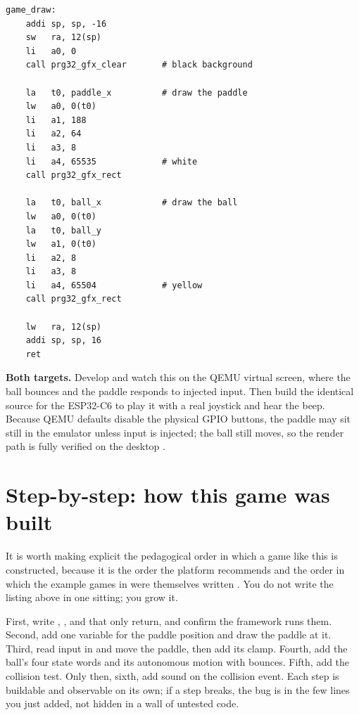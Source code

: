 \begin{lstlisting}[style=asm,caption={The \code{draw} of the complete game. Compare it line for line with \code{pong\_graphics\_draw} in the repository.}]
game_draw:
    addi sp, sp, -16
    sw   ra, 12(sp)
    li   a0, 0
    call prg32_gfx_clear       # black background

    la   t0, paddle_x          # draw the paddle
    lw   a0, 0(t0)
    li   a1, 188
    li   a2, 64
    li   a3, 8
    li   a4, 65535             # white
    call prg32_gfx_rect

    la   t0, ball_x            # draw the ball
    lw   a0, 0(t0)
    la   t0, ball_y
    lw   a1, 0(t0)
    li   a2, 8
    li   a3, 8
    li   a4, 65504             # yellow
    call prg32_gfx_rect

    lw   ra, 12(sp)
    addi sp, sp, 16
    ret
\end{lstlisting}

\begin{prgtargets}
\textbf{Both targets.} Develop and watch this on the QEMU virtual screen, where
the ball bounces and the paddle responds to injected input. Then build the
identical source for the ESP32\nobreakdash-C6 to play it with a real joystick and hear the
beep. Because QEMU defaults disable the physical GPIO buttons, the paddle may sit
still in the emulator unless input is injected; the ball still moves, so the
render path is fully verified on the desktop \citep{prg32qemu}.
\end{prgtargets}

\section{Step-by-step: how this game was built}

It is worth making explicit the pedagogical order in which a game like this is
constructed, because it is the order the platform recommends and the order in
which the example games in  were themselves written
\citep{prg32tutorial,prg32tutorialgraphic}. You do not write the listing above in
one sitting; you grow it.

First, write , , and  that only return, and
confirm the framework runs them. Second, add one  variable for the
paddle position and draw the paddle at it. Third, read input in  and
move the paddle, then add its clamp. Fourth, add the ball's four state words and
its autonomous motion with bounces. Fifth, add the collision test. Only then,
sixth, add sound on the collision event. Each step is buildable and observable on
its own; if a step breaks, the bug is in the few lines you just added, not
hidden in a wall of untested code.

